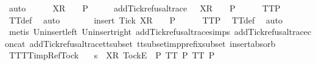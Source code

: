 \begin{isabellebody}
%
\endisadelimproof
%
\isatagproof
{}\isamarkupfalse%
\ auto\isanewline
\ \ \isamarkupfalse%
\ {\isachardoublequoteopen}{\isasymrho}\ {\isacharat}\ {\isacharbrackleft}X{\isacharbrackright}\isactrlsub R\ {\isacharhash}\ {\isasymsigma}\ {\isasymin}\ P{\isachardoublequoteclose}\isanewline
\ \ \isamarkupfalse%
\ \isamarkupfalse%
\ {\isachardoublequoteopen}add{\isacharunderscore}Tick{\isacharunderscore}refusal{\isacharunderscore}trace\ {\isacharparenleft}{\isasymrho}\ {\isacharat}\ {\isacharbrackleft}X{\isacharbrackright}\isactrlsub R\ {\isacharhash}\ {\isasymsigma}{\isacharparenright}\ {\isasymin}\ P{\isachardoublequoteclose}\isanewline
\ \ \ \ \isamarkupfalse%
\ TT{}{\isacharunderscore}P\ \isamarkupfalse%
\ TT{}{\isacharunderscore}def\ \isamarkupfalse%
\ auto\isanewline
\ \ \isamarkupfalse%
\ \isamarkupfalse%
\ {\isachardoublequoteopen}{\isasymrho}\ {\isacharat}\ {\isacharbrackleft}insert\ Tick\ X{\isacharbrackright}\isactrlsub R\ {\isacharhash}\ {\isasymsigma}\ {\isasymin}\ P{\isachardoublequoteclose}\isanewline
\ \ \ \ \isamarkupfalse%
\ TT{}{\isacharunderscore}P\ \isamarkupfalse%
\ TT{}{\isacharunderscore}def\ \isamarkupfalse%
\ auto\isanewline
\ \ \ \ \isamarkupfalse%
\ {\isacharparenleft}metis\ Un{\isacharunderscore}insert{\isacharunderscore}left\ Un{\isacharunderscore}insert{\isacharunderscore}right\ add{\isacharunderscore}Tick{\isacharunderscore}refusal{\isacharunderscore}trace{\isachardot}simps{\isacharparenleft}{}{\isacharparenright}\ add{\isacharunderscore}Tick{\isacharunderscore}refusal{\isacharunderscore}trace{\isacharunderscore}concat\ add{\isacharunderscore}Tick{\isacharunderscore}refusal{\isacharunderscore}trace{\isacharunderscore}tt{\isacharunderscore}subset\ tt{\isacharunderscore}subset{\isacharunderscore}imp{\isacharunderscore}prefix{\isacharunderscore}subset\ insert{\isacharunderscore}absorb{}{\isacharparenright}\isanewline
{}\isamarkupfalse%
%
\endisatagproof
{\isafoldproof}%
%
\isadelimproof
\isanewline
%
\endisadelimproof
\isanewline
{}\isamarkupfalse%
\ TT{}{\isacharunderscore}TT{}{\isacharunderscore}imp{\isacharunderscore}Ref{\isacharunderscore}Tock{\isacharcolon}\isanewline
\ \ \ {\isachardoublequoteopen}s\ {\isacharat}\ {\isacharbrackleft}{\isacharbrackleft}X{\isacharbrackright}\isactrlsub R{\isacharcomma}\ {\isacharbrackleft}Tock{\isacharbrackright}\isactrlsub E{\isacharbrackright}\ {\isasymin}\ P{\isachardoublequoteclose}\ {\isachardoublequoteopen}TT{}\ P{\isachardoublequoteclose}\ {\isachardoublequoteopen}TT{}\ P{\isachardoublequoteclose}\isanewline

\end{isabellebody}
